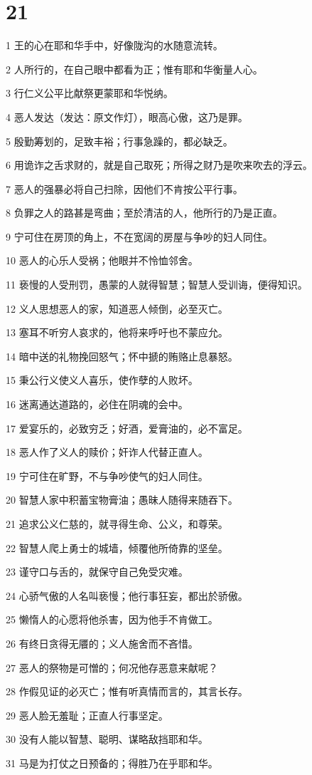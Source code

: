 \chapter{21}

\par 1 王的心在耶和华手中，好像陇沟的水随意流转。
\par 2 人所行的，在自己眼中都看为正；惟有耶和华衡量人心。
\par 3 行仁义公平比献祭更蒙耶和华悦纳。
\par 4 恶人发达（发达：原文作灯），眼高心傲，这乃是罪。
\par 5 殷勤筹划的，足致丰裕；行事急躁的，都必缺乏。
\par 6 用诡诈之舌求财的，就是自己取死；所得之财乃是吹来吹去的浮云。
\par 7 恶人的强暴必将自己扫除，因他们不肯按公平行事。
\par 8 负罪之人的路甚是弯曲；至於清洁的人，他所行的乃是正直。
\par 9 宁可住在房顶的角上，不在宽阔的房屋与争吵的妇人同住。
\par 10 恶人的心乐人受祸；他眼并不怜恤邻舍。
\par 11 亵慢的人受刑罚，愚蒙的人就得智慧；智慧人受训诲，便得知识。
\par 12 义人思想恶人的家，知道恶人倾倒，必至灭亡。
\par 13 塞耳不听穷人哀求的，他将来呼吁也不蒙应允。
\par 14 暗中送的礼物挽回怒气；怀中搋的贿赂止息暴怒。
\par 15 秉公行义使义人喜乐，使作孽的人败坏。
\par 16 迷离通达道路的，必住在阴魂的会中。
\par 17 爱宴乐的，必致穷乏；好酒，爱膏油的，必不富足。
\par 18 恶人作了义人的赎价；奸诈人代替正直人。
\par 19 宁可住在旷野，不与争吵使气的妇人同住。
\par 20 智慧人家中积蓄宝物膏油；愚昧人随得来随吞下。
\par 21 追求公义仁慈的，就寻得生命、公义，和尊荣。
\par 22 智慧人爬上勇士的城墙，倾覆他所倚靠的坚垒。
\par 23 谨守口与舌的，就保守自己免受灾难。
\par 24 心骄气傲的人名叫亵慢；他行事狂妄，都出於骄傲。
\par 25 懒惰人的心愿将他杀害，因为他手不肯做工。
\par 26 有终日贪得无餍的；义人施舍而不吝惜。
\par 27 恶人的祭物是可憎的；何况他存恶意来献呢？
\par 28 作假见证的必灭亡；惟有听真情而言的，其言长存。
\par 29 恶人脸无羞耻；正直人行事坚定。
\par 30 没有人能以智慧、聪明、谋略敌挡耶和华。
\par 31 马是为打仗之日预备的；得胜乃在乎耶和华。

